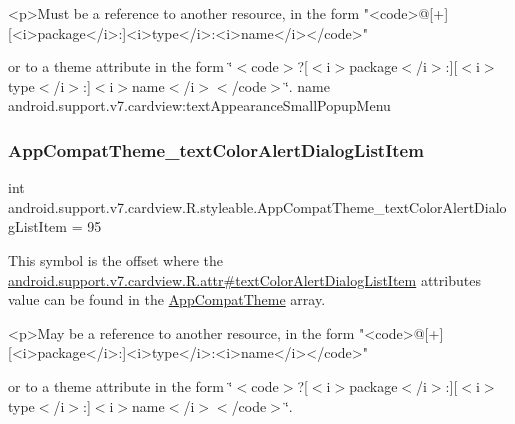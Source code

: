 \begin{DoxyVerb}      <p>Must be a reference to another resource, in the form "<code>@[+][<i>package</i>:]<i>type</i>:<i>name</i></code>"
\end{DoxyVerb}
 or to a theme attribute in the form \char`\"{}$<$code$>$?\mbox{[}$<$i$>$package$<$/i$>$\+:\mbox{]}\mbox{[}$<$i$>$type$<$/i$>$\+:\mbox{]}$<$i$>$name$<$/i$>$$<$/code$>$\char`\"{}.  name android.\+support.\+v7.\+cardview\+:text\+Appearance\+Small\+Popup\+Menu \mbox{\label{classandroid_1_1support_1_1v7_1_1cardview_1_1R_1_1styleable_a730df5f1aaa02f6f44026aa8cd716f2a}} 
\subsubsection{\texorpdfstring{App\+Compat\+Theme\+\_\+text\+Color\+Alert\+Dialog\+List\+Item}{AppCompatTheme\_textColorAlertDialogListItem}}
{\footnotesize\ttfamily int android.\+support.\+v7.\+cardview.\+R.\+styleable.\+App\+Compat\+Theme\+\_\+text\+Color\+Alert\+Dialog\+List\+Item = 95\hspace{0.3cm}{\ttfamily [static]}}

This symbol is the offset where the \hyperlink{classandroid_1_1support_1_1v7_1_1cardview_1_1R_1_1attr_a173e914627b371b0d2f5da8b4c71b625}{android.\+support.\+v7.\+cardview.\+R.\+attr\#text\+Color\+Alert\+Dialog\+List\+Item} attribute\textquotesingle{}s value can be found in the \hyperlink{classandroid_1_1support_1_1v7_1_1cardview_1_1R_1_1styleable_a52e6f69f954ecc2622d72c0b4d298938}{App\+Compat\+Theme} array.

\begin{DoxyVerb}      <p>May be a reference to another resource, in the form "<code>@[+][<i>package</i>:]<i>type</i>:<i>name</i></code>"
\end{DoxyVerb}
 or to a theme attribute in the form \char`\"{}$<$code$>$?\mbox{[}$<$i$>$package$<$/i$>$\+:\mbox{]}\mbox{[}$<$i$>$type$<$/i$>$\+:\mbox{]}$<$i$>$name$<$/i$>$$<$/code$>$\char`\"{}. 

